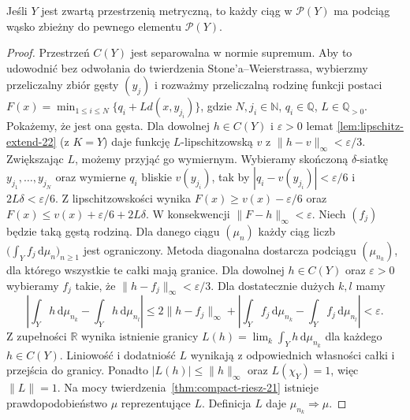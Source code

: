 \begin{lemat}
\label{lem:compact-prob-22}
Jeśli $Y$ jest zwartą przestrzenią metryczną,
to każdy ciąg w $\mathcal P(Y)$ ma podciąg wąsko
zbieżny do pewnego elementu $\mathcal P(Y)$.
\end{lemat}
\begin{proof}
Przestrzeń $C(Y)$ jest separowalna w normie supremum.
Aby to udowodnić bez odwołania do twierdzenia
Stone'a--Weierstrassa, wybierzmy przeliczalny zbiór
gęsty $(y_j)$ i rozważmy przeliczalną rodzinę
funkcji postaci
$F(x)=\min_{1\le i\le N}\{q_i+L d(x,y_{j_i})\}$,
gdzie $N,j_i\in\mathbb N$, $q_i\in\mathbb Q$,
$L\in\mathbb Q_{>0}$.
Pokażemy, że jest ona gęsta. Dla dowolnej
$h\in C(Y)$ i $\varepsilon>0$ lemat
\ref{lem:lipschitz-extend-22} (z $K=Y$) daje
funkcję $L$-lipschitzowską $v$ z
$\|h-v\|_\infty<\varepsilon/3$.
Zwiększając $L$, możemy przyjąć go wymiernym.
Wybieramy skończoną $\delta$-siatkę
$y_{j_1},\ldots,y_{j_N}$ oraz wymierne $q_i$
bliskie $v(y_{j_i})$, tak by
$|q_i-v(y_{j_i})|<\varepsilon/6$ i
$2L\delta<\varepsilon/6$.
Z lipschitzowskości wynika
$F(x)\ge v(x)-\varepsilon/6$ oraz
$F(x)\le v(x)+\varepsilon/6+2L\delta$.
W konsekwencji $\|F-h\|_\infty<\varepsilon$.
Niech $(f_j)$ będzie taką gęstą
rodziną. Dla danego ciągu $(\mu_n)$ każdy ciąg liczb
$\bigl(\int_Y f_j\,\mathrm d\mu_n\bigr)_{n\ge1}$
jest ograniczony.
Metoda diagonalna dostarcza podciągu $(\mu_{n_k})$,
dla którego wszystkie te całki mają granice.
Dla dowolnej $h\in C(Y)$ oraz $\varepsilon>0$
wybieramy $f_j$ takie, że $\|h-f_j\|_\infty<\varepsilon/3$.
Dla dostatecznie dużych $k,l$ mamy
\[
 \left|\int_Y h\,\mathrm d\mu_{n_k}
       -\int_Y h\,\mathrm d\mu_{n_l}\right|
 \le 2\|h-f_j\|_\infty+
 \left|\int_Y f_j\,\mathrm d\mu_{n_k}
       -\int_Y f_j\,\mathrm d\mu_{n_l}\right|
 <\varepsilon.
\]
Z zupełności $\mathbb R$ wynika istnienie granicy
$L(h)=\lim_k\int_Y h\,\mathrm d\mu_{n_k}$ dla każdego
$h\in C(Y)$. Liniowość i dodatniość $L$ wynikają
z odpowiednich własności całki i przejścia do granicy.
Ponadto $|L(h)|\le\|h\|_\infty$ oraz $L(\chi_Y)=1$,
więc $\|L\|=1$.
Na mocy twierdzenia~\ref{thm:compact-riesz-21}
istnieje prawdopodobieństwo $\mu$ reprezentujące $L$.
Definicja $L$ daje $\mu_{n_k}\Rightarrow\mu$.
\end{proof}

